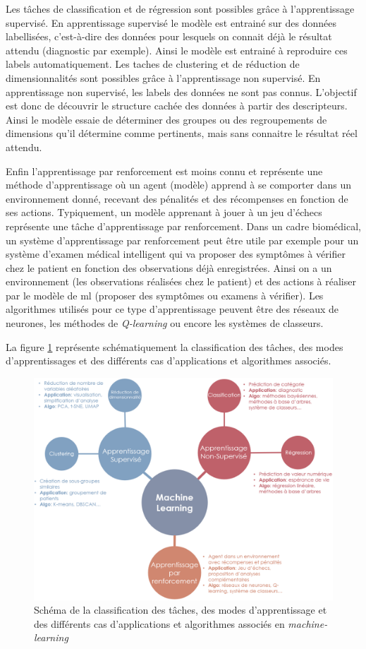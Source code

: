 Les tâches de classification et de régression sont possibles grâce à l'apprentissage supervisé. En apprentissage supervisé le modèle est entrainé sur des données labellisées, c'est-à-dire des données pour lesquels on connait déjà le résultat attendu (diagnostic par exemple). Ainsi le modèle est entrainé à reproduire ces labels automatiquement.
Les taches de clustering et de réduction de dimensionnalités sont possibles grâce à l'apprentissage non supervisé. En apprentissage non supervisé, les labels des données ne sont pas connus. L'objectif est donc de découvrir le structure cachée des données à partir des descripteurs. Ainsi le modèle essaie de déterminer des groupes ou des regroupements de dimensions qu'il détermine comme pertinents, mais sans connaitre le résultat réel attendu.

Enfin l'apprentissage par renforcement est moins connu et représente une méthode d'apprentissage où un agent (modèle) apprend à se comporter dans un environnement donné, recevant des pénalités et des récompenses en fonction de ses actions. Typiquement,  un modèle apprenant à jouer à un jeu d'échecs représente une tâche d'apprentissage par renforcement. Dans un cadre biomédical, un système d'apprentissage par renforcement peut être utile par exemple pour un système d'examen médical intelligent qui va proposer des symptômes à vérifier chez le patient en fonction des observations déjà enregistrées. Ainsi on a un environnement (les observations réalisées chez le patient) et des actions à réaliser par le modèle de \gls{ml} (proposer des symptômes ou examens à vérifier). Les algorithmes utilisés pour ce type d'apprentissage peuvent être des réseaux de neurones, les méthodes de \textit{Q-learning} ou encore les systèmes de classeurs.

La figure \ref{fig:ml-landscape} représente schématiquement la classification des tâches, des modes d'apprentissages et des différents cas d'applications et algorithmes associés.
\begin{figure}[!htbp]
 \centering
 \includegraphics[width=1\textwidth]{figures/ml_landscape.png}
 \caption[Schéma des méthodes de machine-learning]{Schéma de la classification des tâches, des modes d'apprentissage et des différents cas d'applications et algorithmes associés en \textit{machine-learning}}
 \label{fig:ml-landscape}
\end{figure}

